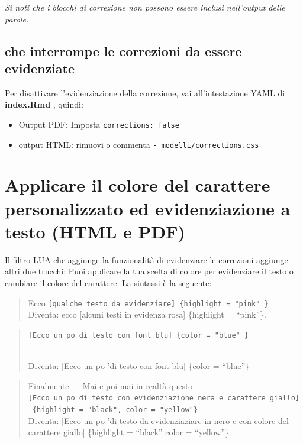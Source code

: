 \documentclass[a4paper, 11pt, nobind]{templates/ociamthesis}
\providecommand{\tightlist}{%
  \setlength{\itemsep}{0pt}\setlength{\parskip}{0pt}}
\begin{document}
\emph{Si noti che i blocchi di correzione non possono essere inclusi nell'output delle parole.}

\hypertarget{che-interrompe-le-correzioni-da-essere-evidenziate}{%
\subsection{che interrompe le correzioni da essere evidenziate}\label{che-interrompe-le-correzioni-da-essere-evidenziate}}

Per disattivare l'evidenziazione della correzione, vai all'intestazione YAML di \textbf{index.Rmd }, quindi:

\begin{itemize}
\tightlist
\item
  Output PDF: Imposta \texttt{corrections:\ false}\\
\item
  output HTML: rimuovi o commenta \texttt{-\ modelli/corrections.css}
\end{itemize}

\hypertarget{applicare-il-colore-del-carattere-personalizzato-ed-evidenziazione-a-testo-html-e-pdf}{%
\section{Applicare il colore del carattere personalizzato ed evidenziazione a testo (HTML e PDF)}\label{applicare-il-colore-del-carattere-personalizzato-ed-evidenziazione-a-testo-html-e-pdf}}

Il filtro LUA che aggiunge la funzionalità di evidenziare le correzioni aggiunge altri due trucchi:
Puoi applicare la tua scelta di colore per evidenziare il testo o cambiare il colore del carattere.
La sintassi è la seguente:

\begin{quote}
Ecco \texttt{{[}qualche\ testo\ da\ evidenziare{]}\ \{highlight\ =\ "pink"\ \}}\\
Diventa: ecco {[}alcuni testi in evidenza rosa{]} \{highlight = ``pink''\}.
\end{quote}

\begin{quote}
\texttt{{[}Ecco\ un\ po\ \textquotesingle{}di\ testo\ con\ font\ blu{]}\ \{color\ =\ "blue"\ \}}\strut \\
Diventa: {[}Ecco un po 'di testo con font blu{]} \{color = ``blue''\}
\end{quote}

\begin{quote}
Finalmente --- Mai e poi mai in realtà questo-\texttt{{[}Ecco\ un\ po\ \textquotesingle{}di\ testo\ con\ evidenziazione\ nera\ e\ carattere\ giallo{]}\ \{highlight\ =\ "black",\ color\ =\ "yellow"\}}\\
Diventa: {[}Ecco un po 'di testo da evidenziaziare in nero e con colore del carattere giallo{]} \{highlight = ``black'' color = ``yellow''\}
\end{quote}
\end{document}
